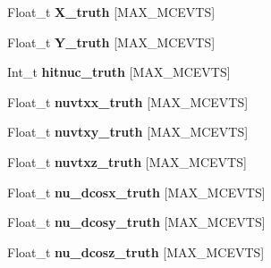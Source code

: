 \begin{DoxyCompactItemize}
\item 
\hypertarget{classanatree_af5f6b57a761380a82891afb9f1087992}{Float\-\_\-t {\bfseries X\-\_\-truth} \mbox{[}M\-A\-X\-\_\-\-M\-C\-E\-V\-T\-S\mbox{]}}\label{classanatree_af5f6b57a761380a82891afb9f1087992}

\item 
\hypertarget{classanatree_af7eb0221e94b46b77a90aedf51889a33}{Float\-\_\-t {\bfseries Y\-\_\-truth} \mbox{[}M\-A\-X\-\_\-\-M\-C\-E\-V\-T\-S\mbox{]}}\label{classanatree_af7eb0221e94b46b77a90aedf51889a33}

\item 
\hypertarget{classanatree_ac23f35e76a539454d9691e04145db331}{Int\-\_\-t {\bfseries hitnuc\-\_\-truth} \mbox{[}M\-A\-X\-\_\-\-M\-C\-E\-V\-T\-S\mbox{]}}\label{classanatree_ac23f35e76a539454d9691e04145db331}

\item 
\hypertarget{classanatree_a92c51324b100335fe4c20147adce865a}{Float\-\_\-t {\bfseries nuvtxx\-\_\-truth} \mbox{[}M\-A\-X\-\_\-\-M\-C\-E\-V\-T\-S\mbox{]}}\label{classanatree_a92c51324b100335fe4c20147adce865a}

\item 
\hypertarget{classanatree_a4ea31f104f553fdd9c9bd220bf72bd7e}{Float\-\_\-t {\bfseries nuvtxy\-\_\-truth} \mbox{[}M\-A\-X\-\_\-\-M\-C\-E\-V\-T\-S\mbox{]}}\label{classanatree_a4ea31f104f553fdd9c9bd220bf72bd7e}

\item 
\hypertarget{classanatree_a297ced810be2bb0768ad96028d5be97e}{Float\-\_\-t {\bfseries nuvtxz\-\_\-truth} \mbox{[}M\-A\-X\-\_\-\-M\-C\-E\-V\-T\-S\mbox{]}}\label{classanatree_a297ced810be2bb0768ad96028d5be97e}

\item 
\hypertarget{classanatree_a0a7f66e5679071fff56161fbdc2bb6c3}{Float\-\_\-t {\bfseries nu\-\_\-dcosx\-\_\-truth} \mbox{[}M\-A\-X\-\_\-\-M\-C\-E\-V\-T\-S\mbox{]}}\label{classanatree_a0a7f66e5679071fff56161fbdc2bb6c3}

\item 
\hypertarget{classanatree_a277fed28b0e07b2734601d9185d09370}{Float\-\_\-t {\bfseries nu\-\_\-dcosy\-\_\-truth} \mbox{[}M\-A\-X\-\_\-\-M\-C\-E\-V\-T\-S\mbox{]}}\label{classanatree_a277fed28b0e07b2734601d9185d09370}

\item 
\hypertarget{classanatree_abc5b050e4d6d653f8cf3872e89cc87de}{Float\-\_\-t {\bfseries nu\-\_\-dcosz\-\_\-truth} \mbox{[}M\-A\-X\-\_\-\-M\-C\-E\-V\-T\-S\mbox{]}}\label{classanatree_abc5b050e4d6d653f8cf3872e89cc87de}


\end{DoxyCompactItemize}
